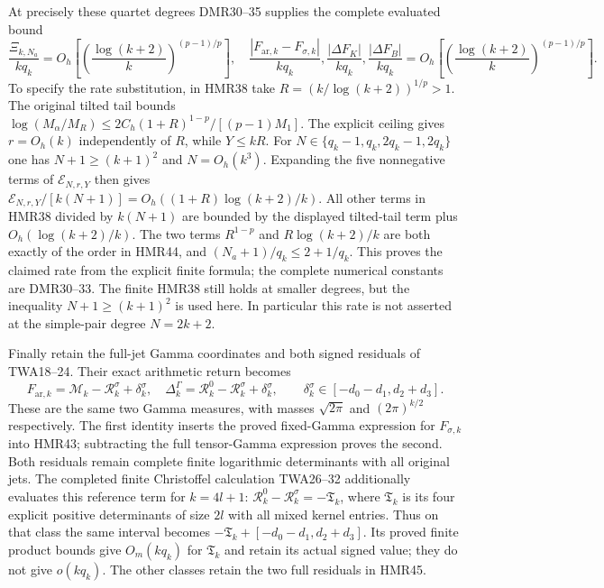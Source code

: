 At precisely these quartet degrees DMR30--35 supplies the
complete evaluated bound
\[
 \frac{\Xi_{k,N_a}}{kq_k}
 =O_h\!\left[
 \left(\frac{\log(k+2)}{k}\right)^{(p-1)/p}\right],
 \quad
 \frac{|F_{\mathrm{ar},k}-F_{\sigma,k}|}{kq_k},
 \frac{|\Delta F_K|}{kq_k},\frac{|\Delta F_B|}{kq_k}
 =O_h\!\left[
 \left(\frac{\log(k+2)}{k}\right)^{(p-1)/p}\right].
 \tag{HMR44}
\]
To specify the rate substitution, in HMR38 take
$R=(k/\log(k+2))^{1/p}>1$. The original tilted tail bounds
$\log(M_\alpha/M_R)\leq
2C_h(1+R)^{1-p}/[(p-1)M_1]$. The explicit ceiling gives
$r=O_h(k)$ independently of $R$, while $Y\leq kR$.
For $N\in\{q_k-1,q_k,2q_k-1,2q_k\}$ one has
$N+1\geq(k+1)^2$ and $N=O_h(k^3)$.
Expanding the five nonnegative terms of
$\mathcal E_{N,r,Y}$ then gives
$\mathcal E_{N,r,Y}/[k(N+1)]
=O_h((1+R)\log(k+2)/k)$.
All other terms in HMR38 divided by $k(N+1)$ are bounded
by the displayed tilted-tail term plus
$O_h(\log(k+2)/k)$.
The two terms $R^{1-p}$ and $R\log(k+2)/k$ are both
exactly of the order in HMR44, and $(N_a+1)/q_k\leq2+1/q_k$.
This proves the claimed rate from the explicit finite formula;
the complete numerical constants are DMR30--33.
The finite HMR38 still holds at smaller degrees, but the
inequality $N+1\geq(k+1)^2$ is used here. In particular this
rate is not asserted at the simple-pair degree $N=2k+2$.

Finally retain the full-jet Gamma coordinates and both signed
residuals of TWA18--24. Their exact arithmetic return becomes
\[
 F_{\mathrm{ar},k}=\mathcal M_k-\mathcal R_k^\sigma+\delta_k^\sigma,
 \quad
 \Delta_k^\Gamma=\mathcal R_k^0-\mathcal R_k^\sigma+\delta_k^\sigma,
 \qquad
 \delta_k^\sigma\in[-d_0-d_1,d_2+d_3].
 \tag{HMR45}
\]
These are the same two Gamma measures, with masses
$\sqrt{2\pi}$ and $(2\pi)^{k/2}$ respectively. The first
identity inserts the proved fixed-Gamma expression for
$F_{\sigma,k}$ into HMR43; subtracting the full tensor-Gamma
expression proves the second. Both residuals remain complete
finite logarithmic determinants with all original jets.
The completed finite Christoffel calculation TWA26--32
additionally evaluates this reference term for $k=4l+1$:
$\mathcal R_k^0-\mathcal R_k^\sigma=-\mathfrak T_k$,
where $\mathfrak T_k$ is its four explicit positive
determinants of size $2l$ with all mixed kernel entries.
Thus on that class the same interval becomes
$-\mathfrak T_k+[-d_0-d_1,d_2+d_3]$.
Its proved finite product bounds give $O_m(kq_k)$
for $\mathfrak T_k$ and retain its actual signed value;
they do not give $o(kq_k)$. The other classes retain
the two full residuals in HMR45.
